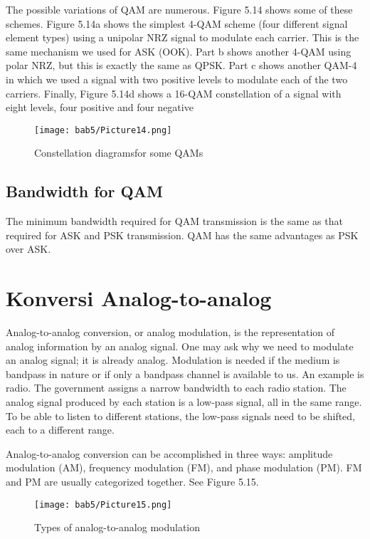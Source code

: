 The possible variations of QAM are numerous. Figure 5.14 shows some of these schemes. Figure 5.14a shows the simplest 4-QAM scheme (four different signal element types) using a unipolar NRZ signal to modulate each carrier. This is the same mechanism we used for ASK (OOK). Part b shows another 4-QAM using polar NRZ, but this is exactly the same as QPSK. Part c shows another QAM-4 in which we used a signal with two positive levels to modulate each of the two carriers. Finally, Figure 5.14d shows a 16-QAM constellation of a signal with eight levels, four positive and four negative

\begin{figure}
  \centering
  \texttt{[image: bab5/Picture14.png]}
  \caption{Constellation diagramsfor some QAMs}
  \label{fig5:14}
\end{figure}

\subsection*{Bandwidth for QAM}
The minimum bandwidth required for QAM transmission is the same as that required for ASK and PSK transmission. QAM has the same advantages as PSK over ASK.

\section{Konversi Analog-to-analog}
Analog-to-analog conversion, or analog modulation, is the representation of analog information by an analog signal. One may ask why we need to modulate an analog signal; it is already analog. Modulation is needed if the medium is bandpass in nature or if only a bandpass channel is available to us. An example is radio. The government assigns a narrow bandwidth to each radio station. The analog signal produced by each station is a low-pass signal, all in the same range. To be able to listen to different stations, the low-pass signals need to be shifted, each to a different range.

Analog-to-analog conversion can be accomplished in three ways: amplitude modulation (AM), frequency modulation (FM), and phase modulation (PM). FM and PM are usually categorized together. See Figure 5.15.

\begin{figure}
  \centering
  \texttt{[image: bab5/Picture15.png]}
  \caption{Types of analog-to-analog modulation}
  \label{fig5:15}
\end{figure}

